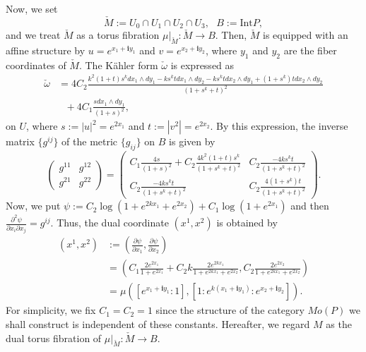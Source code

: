 \documentclass[12pt,reqno]{amsart}
\newcommand{\ii}{{\mathbf{i}}}
\newcommand{\del}{{\partial}}
\theoremstyle{definition}
\begin{document}
Now, we set
\begin{equation*}
\check{M}:=U_0\cap U_1\cap U_2\cap U_3,\ \ \ B:=\mathrm{Int}P,
\end{equation*}
and we treat $\check{M}$ as a torus fibration $\mu|_{\check{M}}:\check{M}\to B$. Then, $\check{M}$ is equipped with an affine structure by $u=e^{x_1+\ii y_1}$ and $v=e^{x_2+\ii y_2}$, where $y_1$ and $y_2$ are the fiber coordinates of $\check{M}$. The K\"ahler form $\check{\omega}$ is expressed as
\begin{equation*}
\begin{split}
\check{\omega}  &= 4 C_2\frac{k^2(1+t)s^kdx_1\wedge dy_1 -ks^ktdx_1\wedge dy_2 - ks^ktdx_2\wedge dy_1 +(1+s^k)tdx_2\wedge dy_2}{(1+s^k+t)^2}\\
 &\ \ \ +4 C_1\frac{sdx_1\wedge dy_1}{(1+s)^2},
\end{split}
\end{equation*} 
 on $U$, where $s:=|u|^2 = e^{2x_1}$ and $t:=|v^2|= e^{2x_2}$. By this expression, the inverse matrix $\{g^{ij}\}$ of the metric $\{g_{ij}\}$ on $B$ is given by
\begin{equation*}
\begin{pmatrix}
g^{11} & g^{12}\\
g^{21} & g^{22}
\end{pmatrix}
=
\begin{pmatrix}
C_1\frac{4 s}{(1+s)^2} + C_2\frac{4k^2(1+t)s^k}{(1+s^k+t)^2} & C_2\frac{-4 ks^kt}{(1+s^k+t)^2} \\
C_2\frac{-4 ks^kt}{(1+s^k+t)^2} & C_2\frac{4(1+s^k)t}{(1+s^k+t)^2}
\end{pmatrix}.
\end{equation*}
Now, we put $\psi:=C_2\log(1+e^{2k x_1}+e^{2 x_2}) + C_1\log(1+e^{2 x_1})$ and then $\frac{\del^2 \psi}{\del x_i\del x_j}=g^{ij}$. Thus, the dual coordinate $(x^1,x^2)$ is obtained by
\begin{equation*}
\begin{split}
(x^1,x^2)
&:=
\left(\frac{\del\psi}{\del x_1} , \frac{\del\psi}{\del x_2}\right)\\
&=
\left(C_1\frac{2e^{2 x_1}}{1+e^{2 x_1}} + C_2k\frac{2e^{2k x_1}}{1+e^{2k x_1}+e^{2 x_2}}, C_2\frac{2e^{2 x_2}}{1+e^{2k x_1}+e^{2 x_2}}\right)\\
&=
\mu\left([e^{x_1+\ii y_1}:1],[1:e^{k(x_1+\ii y_1)}:e^{x_2+\ii y_2}]\right).
\end{split}
\end{equation*}
For simplicity, we fix $C_1=C_2=1$ since the structure of the category $Mo(P)$ we shall construct is independent of these constants.
Hereafter, we regard $M$ as the dual torus fibration of $\mu|_{\check{M}}:\check{M}\to B$.
\end{document}
